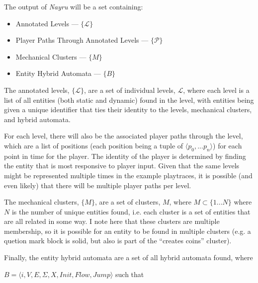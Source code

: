 \documentclass[a4paper]{article}
\begin{document}
The output of \textit{Nayru} will be a set containing:

\begin{itemize}
\item Annotated Levels --- $\{\mathcal{L}\}$
\item Player Paths Through Annotated Levels --- $\{\mathcal{P}\}$
\item Mechanical Clusters --- $\{M\}$
\item Entity Hybrid Automata --- $\{B\}$
\end{itemize}

The annotated levels,  $\{\mathcal{L}\}$, are a set of individual levels, $\mathcal{L}$, where each level is a list of all entities (both static and dynamic) found in the level, with entities being given a unique identifier that ties their identity to the levels, mechanical clusters, and hybrid automata.

For each level, there will also be the associated player paths through the level, which are a list of positions (each position being a tuple of $\langle p_0,...p_n\rangle$) for each point in time for the player.  The identity of the player is determined by finding the entity that is most responsive to player input.  Given that the same levels might be represented multiple times in the example playtraces, it is possible (and even likely) that there will be multiple player paths per level. 

The mechanical clusters, $\{M\}$, are a set of clusters, $M$, where $M \subset \{1...N\}$ where $N$ is the number of unique entities found, i.e. each cluster is a set of entities that are all related in some way.  I note here that these clusters are multiple membership, so it is possible for an entity to be found in multiple clusters (e.g. a quetion mark block is solid, but also is part of the ``creates coins'' cluster).

Finally, the entity hybrid automata are a set of all hybrid automata found, where

$B = \langle i, V, E, \Sigma, X, Init, Flow,Jump\rangle$
such that
\end{document}
